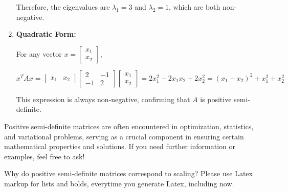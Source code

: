 \begin{airesult}
\begin{enumerate}
  Therefore, the eigenvalues are \(\lambda_1 = 3\) and \(\lambda_2 = 1\), which are both
  non-negative.

  \item \textbf{Quadratic Form:}

  For any vector \(x = \begin{bmatrix} x_1 \\ x_2 \end{bmatrix}\),

  \[
  x^T A x =
  \begin{bmatrix} x_1 & x_2 \end{bmatrix}
  \begin{bmatrix}
  2 & -1 \\
  -1 & 2
  \end{bmatrix}
  \begin{bmatrix} x_1 \\ x_2 \end{bmatrix}
  = 2x_1^2 - 2x_1x_2 + 2x_2^2
  = (x_1 - x_2)^2 + x_1^2 + x_2^2
  \]

  This expression is always non-negative, confirming that \(A\) is positive semi-definite.
\end{enumerate}

Positive semi-definite matrices are often encountered in optimization, statistics, and variational
problems, serving as a crucial component in ensuring certain mathematical properties and solutions.
If you need further information or examples, feel free to ask!
\end{airesult}

\begin{ai}
Why do positive semi-definite matrices correspond to scaling? Please use Latex markup for lists and
bolds, everytime you generate Latex, including now.
\end{ai}

